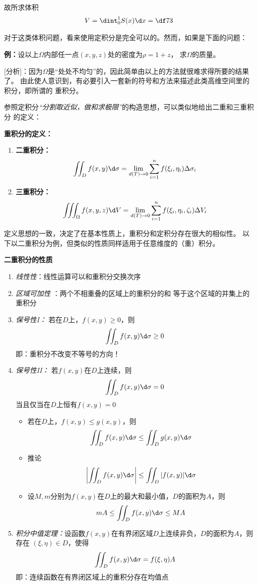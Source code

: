 故所求体积
$$V=\dint_0^1S(x)\d x=\df 73$$

对于这类体积问题，看来使用定积分是完全可以的。然而，如果是下面的问题：\fin

{\bf 例：}设以上$\Omega$内部任一点$(x,y,z)$处的密度为$\rho=1+z$，
求$\Omega$的质量。

[分析]：因为$\Omega$是“处处不均匀”的，因此简单由以上的方法就很难求得所要的结果了。
由此使人意识到，有必要引入一套新的符号和方法来描述此类高维空间里的积分，即所谓的
{\kaishu 重积分}。

参照定积分{\it “分割取近似，做和求极限”}的构造思想，可以类似地给出二重和三重积分
的定义：
\begin{thx}
	{\bf 重积分的定义：}
	\begin{enumerate}
	  \item {\bf 二重积分：} 
	  $$\iint_Df(x,y)\d\sigma=\lim_{d(T)\to
	  0}\sum_{i=1}^nf(\xi_i,\eta_i)\Delta\sigma_i$$ 
	  \item {\bf 三重积分：} 
	  $$\iiint_{\Omega}f(x,y,z)\d V=\lim_{d(T)\to
	  0}\sum_{i=1}^nf(\xi_i,\eta_i,\zeta_i)\Delta V_i$$
	\end{enumerate}
\end{thx}

定义思想的一致，决定了在基本性质上，重积分和定积分存在很大的相似性。
以下以二重积分为例，但类似的性质同样适用于任意维度的（重）积分。
\begin{thx}
	{\bf 二重积分的性质}
	\begin{enumerate}
	  \item {\it 线性性}：线性运算可以和重积分交换次序 
	  \item {\it 区域可加性} ：两个不相重叠的区域上的重积分的和
	  等于这个区域的并集上的重积分
	  \item {\it 保号性I：} 若在$D$上，$f(x,y)\geq 0$，则
	  $$\iint_Df(x,y)\d\sigma\geq 0$$ 
	  即：重积分不改变不等号的方向！
	  \item {\it 保号性II：} 若$f(x,y)$在$D$上连续，则
	  $$\iint_Df(x,y)\d\sigma=0$$
	  当且仅当在$D$上恒有$f(x,y)=0$
	    \begin{itemize}
		  \item 若在$D$上，$f(x,y)\leq g(x,y)$，则
		  $$\iint_Df(x,y)\d\sigma\leq\iint_Dg(x,y)\d\sigma$$ 
		  \item 推论
		  $$\left|\iint_Df(x,y)\d\sigma\right|\leq\iint_D|f(x,y)|\d\sigma$$ 
		  \item 设$M,m$分别为$f(x,y)$在$D$上的最大和最小值，$D$的面积为$A$，则
		  $$mA\leq\iint_Df(x,y)\d\sigma\leq MA$$
		\end{itemize}
	  \item {\it 积分中值定理：}设函数$f(x,y)$在有界闭区域$D$上连续非负，$D$的面积为$A$，则存在
		$(\xi,\eta)\in D$，使得
		$$\iint_Df(x,y)\d\sigma=f(\xi,\eta)A$$
	  即：连续函数在有界闭区域上的重积分存在均值点
	\end{enumerate}
\end{thx}


